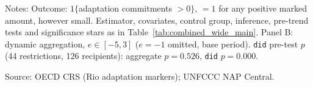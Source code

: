 \begin{table}[H]
\centering
\caption{Extensive margin: effect of NAP adoption on the probability of receiving any adaptation-marked commitment}
\label{tab:extensive_margin}
\par\vspace{4pt}
\begin{minipage}{\linewidth}\footnotesize
Notes: Outcome: $1\{$adaptation commitments $>0\}$, $=1$ for any positive marked amount, however small. Estimator, covariates, control group, inference, pre-trend tests and significance stars as in Table~\ref{tab:combined_wide_main}. Panel B: dynamic aggregation, $e \in [-5, 3]$ ($e=-1$ omitted, base period). \texttt{did} pre-test $p$ (44 restrictions, 126 recipients): aggregate $p = 0.526$, \texttt{did} $p = 0.000$.\par
Source: OECD CRS (Rio adaptation markers); UNFCCC NAP Central.
\end{minipage}
\end{table}
